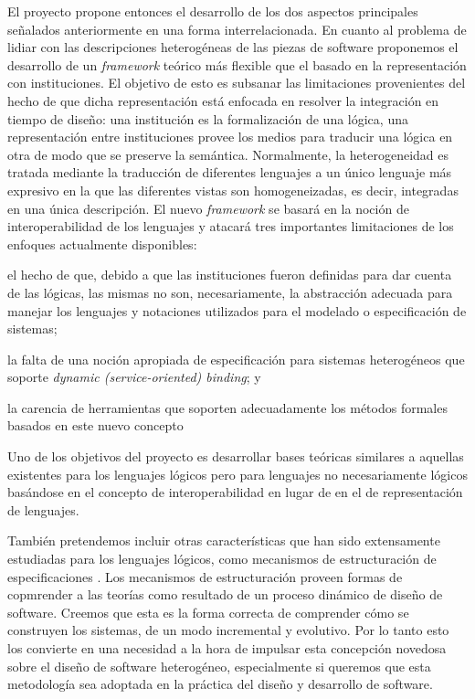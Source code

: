 \documentclass[a4paper, 11pt]{article}
\begin{document}
  El proyecto propone entonces el desarrollo de los dos aspectos principales señalados anteriormente en una forma interrelacionada. En cuanto al problema de lidiar con las descripciones heterogéneas de las piezas de software proponemos el desarrollo de un \emph{framework} teórico más flexible que el basado en la representación con instituciones\cite{tarlecki:sadt-rtdts95}. El objetivo de esto es subsanar las limitaciones provenientes del hecho de que dicha representación está enfocada en resolver la integración en tiempo de diseño: una institución\cite{goguen:cmwlp84} es la formalización de una lógica, una representación entre instituciones provee los medios para traducir una lógica en otra de modo que se preserve la semántica. Normalmente, la heterogeneidad es tratada mediante la traducción de diferentes lenguajes a un único lenguaje más expresivo en la que las diferentes vistas son homogeneizadas, es decir, integradas en una única descripción. El nuevo \emph{framework} se basará en la noción de interoperabilidad de los lenguajes y atacará tres importantes limitaciones de los enfoques actualmente disponibles:
  \begin{inparaenum}
  \item el hecho de que, debido a que las instituciones fueron definidas para dar cuenta de las lógicas, las mismas no son, necesariamente, la abstracción adecuada para manejar los lenguajes y notaciones utilizados para el modelado o especificación de sistemas;
  \item la falta de una noción apropiada de especificación para sistemas heterogéneos que soporte \emph{dynamic (service-oriented) binding}; y
  \item la carencia de herramientas que soporten adecuadamente los métodos formales basados en este nuevo concepto
  \end{inparaenum}
  
  Uno de los objetivos del proyecto es desarrollar bases teóricas similares a aquellas existentes para los lenguajes lógicos pero para lenguajes no necesariamente lógicos basándose en el concepto de interoperabilidad en lugar de en el de representación de lenguajes.
  
  También pretendemos incluir otras características que han sido extensamente estudiadas para los lenguajes lógicos, como mecanismos de estructuración de especificaciones \cite{borzyszkowski:tcs-286_2,lopezpombo:ictac10}. Los mecanismos de estructuración proveen formas de copmrender a las teorías como resultado de un proceso dinámico de diseño de software. Creemos que esta es la forma correcta de comprender cómo se construyen los sistemas, de un modo incremental y evolutivo. Por lo tanto esto los convierte en una necesidad  a la hora de impulsar esta concepción novedosa sobre el diseño de software heterogéneo, especialmente si queremos que esta metodología sea adoptada en la práctica del diseño y desarrollo de software.
  
\end{document}
